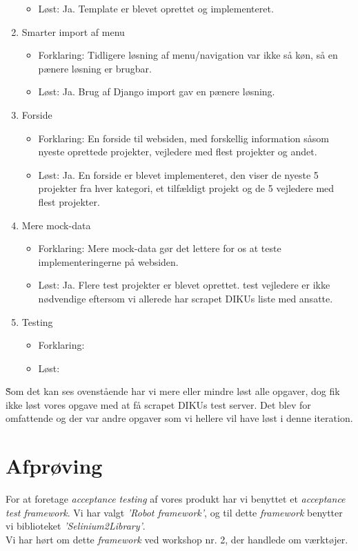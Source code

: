 \documentclass[11pt]{article}
\begin{document}
\begin{enumerate}
\begin{itemize}
        \item Løst: Ja. Template er blevet oprettet og implementeret.
	\end{itemize}
\item Smarter import af menu
	\begin{itemize}
	\item Forklaring: Tidligere løsning af menu/navigation var ikke så køn, så en pænere løsning er brugbar.
        \item Løst: Ja. Brug af Django import gav en pænere løsning.
	\end{itemize}
\item Forside
	\begin{itemize}
	\item Forklaring: En forside til websiden, med forskellig information såsom nyeste oprettede projekter, vejledere med flest projekter og andet.
        \item Løst: Ja. En forside er blevet implementeret, den viser de nyeste 5 projekter fra hver kategori, et tilfældigt projekt og de 5 vejledere med flest projekter.
	\end{itemize}
\item Mere mock-data
	\begin{itemize}
	\item Forklaring: Mere mock-data gør det lettere for os at teste implementeringerne på websiden.
        \item Løst: Ja. Flere test projekter er blevet oprettet. test vejledere er ikke nødvendige eftersom vi allerede har scrapet DIKUs liste med ansatte.
	\end{itemize}
\item Testing
	\begin{itemize}
	\item Forklaring: 
        \item Løst:
	\end{itemize}
\end{enumerate}
\~
Som det kan ses ovenstående har vi mere eller mindre løst alle opgaver, dog fik ikke løst vores opgave med at få scrapet DIKUs test server. Det blev for omfattende og der var andre opgaver som vi hellere vil have løst i denne iteration.

\section{Afprøving}
For at foretage \textit{acceptance testing} af vores produkt har vi benyttet et \textit{acceptance test framework}. Vi har valgt \textit{'Robot framework'}, og til dette \textit{framework} benytter vi biblioteket \textit{'Selinium2Library'}. \\
Vi har hørt om dette \textit{framework} ved workshop nr. 2, der handlede om værktøjer.
\end{document}
